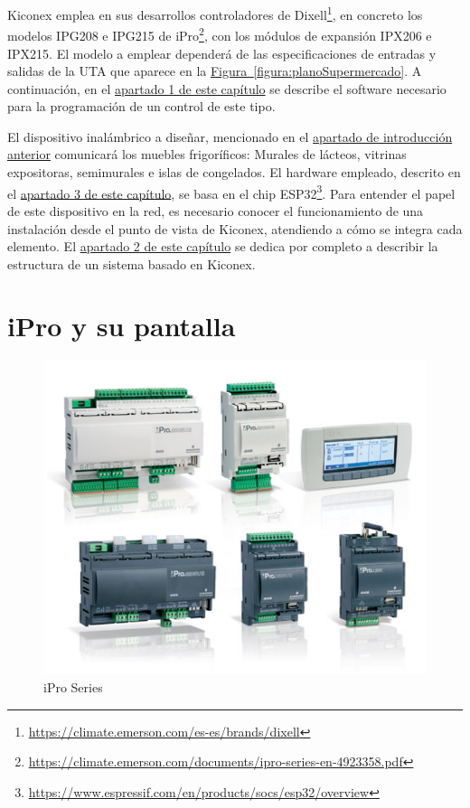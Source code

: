 Kiconex emplea en sus desarrollos controladores de Dixell\footnote{\url{https://climate.emerson.com/es-es/brands/dixell}}, en concreto los modelos IPG208 e IPG215 de iPro\footnote{\url{https://climate.emerson.com/documents/ipro-series-en-4923358.pdf}}, con los módulos de expansión IPX206 e IPX215\footnotemark[2]. El modelo a emplear dependerá de las especificaciones de entradas y salidas de la UTA que aparece en la \hyperref[figura:planoSupermercado]{Figura~\ref{figura:planoSupermercado}}. A continuación, en el \hyperref[sec:kiconex]{apartado 1 de este capítulo} se describe el software necesario para la programación de un control de este tipo.

El dispositivo inalámbrico a diseñar, mencionado en el \hyperref[chap:intro]{apartado de introducción anterior} comunicará los muebles frigoríficos: Murales de lácteos, vitrinas expositoras, semimurales e islas de congelados. El hardware empleado, descrito en el \hyperref[sec:esp32poe]{apartado 3 de este capítulo}, se basa en el chip ESP32\footnote{\url{https://www.espressif.com/en/products/socs/esp32/overview}}. Para entender el papel de este dispositivo en la red, es necesario conocer el funcionamiento de una instalación desde el punto de vista de Kiconex, atendiendo a cómo se integra cada elemento. El \hyperref[sec:kiconex]{apartado 2 de este capítulo} se dedica por completo a describir la estructura de un sistema basado en Kiconex.

\section{iPro y su pantalla}
\label{sec:iproypantalla}

\begin{figure}[h]
  \centering
  \includegraphics[width=12cm, keepaspectratio]{img/iproSeries}
  \caption{iPro Series}
  \label{figura:iproSeries}
\end{figure}

